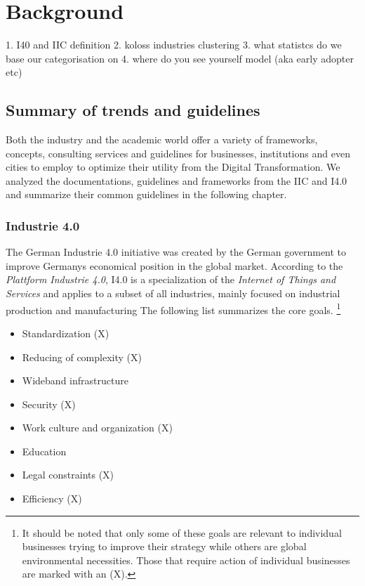 \section{Background}


1. I40 and IIC definition
2. koloss industries clustering 
3. what statistcs do we base our categorisation on
4. where do you see yourself model (aka early adopter etc)


\subsection{Summary of trends and guidelines}

Both the industry and the academic world offer a variety of frameworks, concepts, consulting services and guidelines for businesses, institutions and even cities to employ to optimize their utility from the Digital Transformation.
We analyzed the documentations, guidelines and frameworks from the IIC and I4.0 and summarize their common guidelines in the following chapter.

\subsubsection{Industrie 4.0}
The German Industrie 4.0 initiative was created by the German government to improve Germanys economical position in the global market. According to the \emph{Plattform Industrie 4.0}, I4.0 is a specialization of the \emph{Internet of Things and Services} and applies to a subset of all industries, mainly focused on industrial production and manufacturing
\cite[p.41]{umsetzungsstrategie:2015}
 The following list summarizes the core goals. \footnote{It should be noted that only some of these goals are relevant to individual businesses trying to improve their strategy while others are global environmental necessities. Those that require action of individual businesses are marked with an (X).}

\begin{itemize}
	\item  Standardization (X)
	\item  Reducing of complexity (X)
	\item  Wideband infrastructure
	\item  Security (X)
	\item  Work culture and organization (X)
	\item  Education
	\item  Legal constraints (X)
	\item  Efficiency (X)
\end{itemize}
\cite[p.8]{umsetzungsstrategie:2015}

